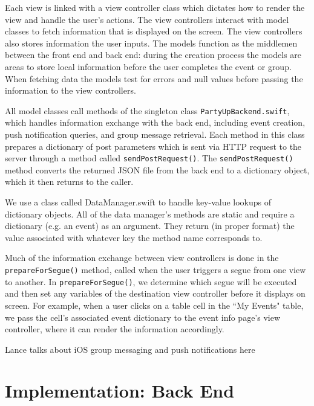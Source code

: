 \documentclass[12pt]{article}
\begin{document}
Each view is linked with a view controller class
which dictates how to render the view and handle the user's actions. 
The view controllers interact with model classes to fetch information 
that is displayed on the screen. 
The view controllers also stores information the user inputs. 
The models function as the middlemen between the front end and back end: 
during the creation process the models are areas to store local information 
before the user completes the event or group. When fetching data the models 
test for errors and null values before passing the information to the view controllers.

All model classes call methods of the singleton class \texttt{PartyUpBackend.swift},
which handles information exchange with the back end, including event creation,
push notification queries, and group message retrieval.
Each method in this class prepares a dictionary of post parameters which is
sent via HTTP request to the server through a method called \texttt{sendPostRequest()}.
The \texttt{sendPostRequest()} method converts the returned JSON file from the back end to a dictionary object,
which it then returns to the caller.

We use a class called DataManager.swift to handle key-value lookups of dictionary objects.
All of the data manager's methods are static and require a dictionary (e.g. an event) as an argument.
They return (in proper format) the value associated with whatever key the method name corresponds to. 

Much of the information exchange between view controllers is done in the \texttt{prepareForSegue()} method,
called when the user triggers a segue from one view to another. In \texttt{prepareForSegue()},
we determine which segue will be executed and then set any variables of the destination view
controller before it displays on screen.
For example, when a user clicks on a table cell in the ``My Events" table,
we pass the cell's associated event dictionary to the event info page's view controller,
where it can render the information accordingly. 


Lance talks about iOS group messaging and push notifications here


\section{Implementation: Back End}
\end{document}
